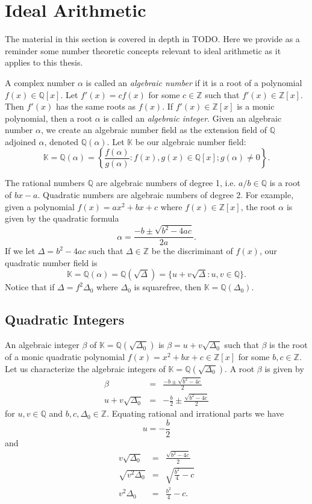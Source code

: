 \documentclass[11pt, letterpaper]{book}
\theoremstyle{definition}
\newcommand{\KK}{\mathbb{K}}
\newcommand{\ZZ}{\mathbb{Z}}
\newcommand{\QQ}{\mathbb{Q}}
\begin{document}
\setcounter{chapter}{1}
\chapter{Ideal Arithmetic}


The material in this section is covered in depth in TODO.  Here we provide as a reminder some number theoretic concepts relevant to ideal arithmetic as it applies to this thesis.


\bigbreak
A complex number $\alpha$ is called an \emph{algebraic number} if it is a root of a polynomial $f(x) \in \QQ[x]$.  Let $f'(x) = cf(x)$ for some $c \in \ZZ$ such that $f'(x) \in \ZZ[x]$.  Then $f'(x)$ has the same roots as $f(x)$.  If $f'(x) \in \ZZ[x]$ is a monic polynomial, then a root $\alpha$ is called an \emph{algebraic integer}.  Given an algebraic number $\alpha$, we create an algebraic number field as the extension field of $\QQ$ adjoined $\alpha$, denoted $\QQ(\alpha)$. Let $\KK$ be our algebraic number field:
\[
	\KK = \QQ(\alpha) = \left\{ \frac{f(\alpha)}{g(\alpha)} : f(x), g(x) \in \QQ[x]; g(\alpha) \ne 0 \right\}.
\]


\bigbreak
The rational numbers $\QQ$ are algebraic numbers of degree 1, i.e. $a/b \in \QQ$ is a root of $bx - a$.  Quadratic numbers are algebraic numbers of degree 2.  For example, given a polynomial $f(x) = ax^2 + bx + c$ where $f(x) \in \ZZ[x]$, the root $\alpha$ is given by the quadratic formula
\[
	\alpha = \frac{-b \pm \sqrt{b^2 - 4ac}}{2a}.
\]
If we let $\Delta = b^2 -4ac$ such that $\Delta \in \ZZ$ be the discriminant of $f(x)$, our quadratic number field is 
\[
	\KK = \QQ(\alpha) = \QQ(\sqrt{\Delta}) = \{u + v\sqrt{\Delta} : u,v \in \QQ\}.
\]
Notice that if $\Delta = f^2 \Delta_0$ where $\Delta_0$ is squarefree, then $\KK = \QQ(\Delta_0)$.  


\bigbreak
\section{Quadratic Integers}
An algebraic integer $\beta$ of $\KK = \QQ(\sqrt{\Delta_0})$ is $\beta = u+v \sqrt{\Delta_0}$ such that $\beta$ is the root of a monic quadratic polynomial $f(x) = x^2+bx+c \in \ZZ[x]$ for some $b,c \in \ZZ$.  Let us characterize the algebraic integers of $\KK = \QQ(\sqrt{\Delta_0})$.  A root $\beta$ is given by
\begin{eqnarray*}
	\beta & = & \frac{-b \pm \sqrt{b^2-4c}}{2} \\
	u + v \sqrt{\Delta_0} & = & -\frac{b}{2} \pm \frac{\sqrt{b^2-4c}}{2}
\end{eqnarray*}
for $u,v \in \QQ$ and $b,c,\Delta_0 \in \ZZ$.
Equating rational and irrational parts we have
\[
	u = -\frac{b}{2}
\]
and
\begin{eqnarray*}
	v \sqrt{\Delta_0} & = & \frac{\sqrt{b^2 -4c}}{2} \\
	\sqrt{v^2 \Delta_0} & = & \sqrt{\frac{b^2}{4} - c} \\
	v^2 \Delta_0 & = & \frac{b^2}{4} - c.
\end{eqnarray*}
\end{document}
